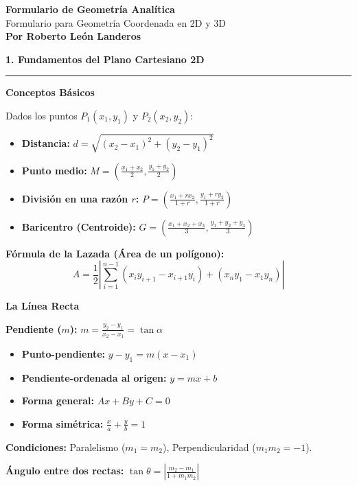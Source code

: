 \documentclass[10pt, landscape, twocolumn]{article}
\newcommand{\cheatsheetsection}[1]{
    \vspace{0.6em}
    {\color{themeblue}\large\bfseries #1} \par
    \vspace{-0.5em}
    {\color{themeblue}\rule{\linewidth}{1pt}} \par
    \vspace{0.2em}
}
\newcommand{\cheatsheetsubsection}[1]{
    \vspace{0.4em}
    {\color{themeblue}\normalsize\bfseries #1} \par
    \vspace{0.1em}
}
\begin{document}
\begin{center}
    \vspace{-1em}
    {\color{themeblue}\huge\bfseries Formulario de Geometría Analítica}\\[0.1em]
    {\color{themegray}\small Formulario para Geometría Coordenada en 2D y 3D}\\[0.4em]
    {\color{themegray}\footnotesize \textbf{Por Roberto León Landeros}}
\end{center}
\vspace{-1em}

\cheatsheetsection{1. Fundamentos del Plano Cartesiano 2D}

\cheatsheetsubsection{Conceptos Básicos}
Dados los puntos $P_1(x_1, y_1)$ y $P_2(x_2, y_2)$:
\begin{itemize}[leftmargin=*, nosep]
    \item \textbf{Distancia:} $d = \sqrt{(x_2 - x_1)^2 + (y_2 - y_1)^2}$
    \item \textbf{Punto medio:} $M = \left( \frac{x_1 + x_2}{2}, \frac{y_1 + y_2}{2} \right)$
    \item \textbf{División en una razón $r$:} $P = \left( \frac{x_1 + rx_2}{1 + r}, \frac{y_1 + ry_2}{1 + r} \right)$
    \item \textbf{Baricentro (Centroide):} $G = \left( \frac{x_1+x_2+x_3}{3}, \frac{y_1+y_2+y_3}{3} \right)$
\end{itemize}

\textbf{Fórmula de la Lazada (Área de un polígono):}
\[ A = \frac{1}{2} \left| \sum_{i=1}^{n-1} (x_i y_{i+1} - x_{i+1} y_i) + (x_n y_1 - x_1 y_n) \right| \]

\cheatsheetsubsection{La Línea Recta}
\textbf{Pendiente ($m$):} $m = \frac{y_2 - y_1}{x_2 - x_1} = \tan \alpha$
\begin{itemize}[leftmargin=*, nosep]
    \item \textbf{Punto-pendiente:} $y - y_1 = m(x - x_1)$
    \item \textbf{Pendiente-ordenada al origen:} $y = mx + b$
    \item \textbf{Forma general:} $Ax + By + C = 0$
    \item \textbf{Forma simétrica:} $\frac{x}{a} + \frac{y}{b} = 1$
\end{itemize}
\textbf{Condiciones:} Paralelismo ($m_1 = m_2$), Perpendicularidad ($m_1 m_2 = -1$).

\textbf{Ángulo entre dos rectas:} $\tan \theta = \left| \frac{m_2 - m_1}{1 + m_1 m_2} \right|$
\end{document}
